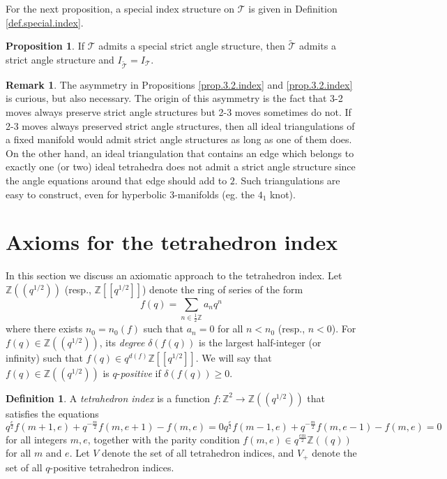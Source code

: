 \documentclass[12pt]{amsart}
\theoremstyle{definition}
\newtheorem{proposition}[theorem]{Proposition}
\newtheorem{definition}[theorem]{Definition}
\newtheorem{remark}[theorem]{Remark}
\def\BZ{\mathbb Z}
\def\calT{\mathcal T}
\def\d{\delta}
\def\longto{\longrightarrow}
\def\be{  \begin{equation} }
\def\ee{  \end{equation} }
\newcommand{\wt}{\widetilde}
\numberwithin{equation}{section}
\begin{document}
For the next proposition, a special index 
structure on $\calT$ is given in Definition \ref{def.special.index}.

\begin{proposition}
\label{prop.2.3.index}
If $\calT$ admits a special strict angle structure, then 
$\wt{\calT}$ admits a strict angle structure and $I_{\wt{\calT}}=I_{\calT}$.
\end{proposition}

\begin{remark}
\label{rem.23curious}
The asymmetry in Propositions \ref{prop.3.2.index} and \ref{prop.3.2.index} 
is curious, but also necessary. The origin of this asymmetry
is the fact that 3-2 moves always preserve strict angle structures but 
2-3 moves sometimes do not. If 2-3 moves always preserved strict angle
structures, then all ideal triangulations of a fixed manifold would admit
strict angle structures as long as one of them does. On the other hand,
an ideal triangulation that contains an edge which belongs to
exactly one (or two) ideal tetrahedra does not admit a strict angle structure
since the angle equations around that edge should add to $2$. Such 
triangulations are easy to construct, even for hyperbolic 3-manifolds (eg.
the $4_1$ knot).
\end{remark}



\section{Axioms for the tetrahedron index}
\label{sec.axioms}

In this section we discuss an axiomatic approach to the tetrahedron 
index. Let $\BZ((q^{1/2}))$ (resp., $\BZ[[q^{1/2}]]$) denote the ring of 
series of the form
$$
f(q)=\sum_{n \in \frac{1}{2}\BZ} a_{n} q^{n}
$$
where there exists $n_0=n_0(f)$ such that $a_n=0$ for all $n < n_0$ (resp.,
$n < 0$). For $f(q) \in \BZ((q^{1/2}))$, its {\em degree}
$\d(f(q))$ is the largest half-integer (or infinity) such that
$f(q) \in q^{d(f)}\BZ[[q^{1/2}]]$. We will say that $f(q) \in \BZ((q^{1/2}))$
is $q$-{\em positive} if $\d(f(q)) \geq 0$.


\begin{definition}
\label{def.2rec}
A {\em tetrahedron index} is a function $f: \BZ^2 \longto \BZ((q^{1/2}))$
that satisfies the equations
\begin{subequations} 
\be
\label{eq.rec1}
 q^{\frac{e}{2}} f(m + 1, e) + q^{-\frac{m}{2}} f(m, e + 1) - f(m, e)=0
\ee
\be
\label{eq.rec2} 
 q^{\frac{e}{2}} f(m - 1, e) + q^{-\frac{m}{2}} f(m, e - 1) - f(m, e)=0
\ee
\end{subequations}
for all integers $m,e$, together with the parity condition $f(m,e) \in
q^{\frac{e m}{2}}\BZ((q))$ for all $m$ and $e$.
Let $V$ denote the set of all tetrahedron indices, and $V_+$ denote 
the set of all $q$-positive tetrahedron indices.
\end{definition}
\end{document}
